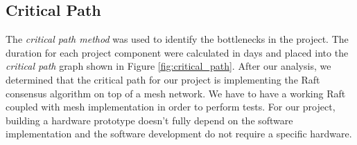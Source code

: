 \subsection{Critical Path}
The \emph{critical path method} was used to identify the bottlenecks in the project. The duration for each project component were calculated in days and placed into the \emph{critical path} graph shown in Figure \ref{fig:critical_path}. After our analysis, we determined that the critical path for our project is implementing the Raft consensus algorithm on top of a mesh network. We have to have a working Raft coupled with mesh implementation in order to perform tests. For our project, building a hardware prototype doesn't fully depend on the software implementation and the software development do not require a specific hardware.

\begin{figure}[ht]
    \centering
    
\end{figure}
